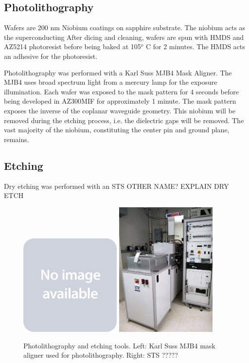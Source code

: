 \documentclass[11 pt, oneside]{book} %
\begin{document}
\subsection{Photolithography}
Wafers are 200 nm Niobium coatings on sapphire substrate. The niobium acts as the superconducting After dicing and cleaning, wafers are spun with HMDS and AZ5214 photoresist before being baked at 105$^o$ C for 2 minutes. The HMDS acts an adhesive for the photoresist. 

Photolithography was performed with a Karl Suss MJB4 Mask Aligner. The MJB4 uses broad spectrum light from a mercury lamp for the exposure illumination. Each wafer was exposed to the mask pattern for 4 seconds before being developed in AZ300MIF for approximately 1 minute. The mask pattern exposes the inverse of the coplanar waveguide geometry. This niobium will be removed during the etching process, i.e. the dielectric gaps will be removed. The vast majority of the niobium, constituting the center pin and ground plane, remains. 

\subsection{Etching}
Dry etching was performed with an STS OTHER NAME? EXPLAIN DRY ETCH

\begin{figure}[h] 
   \centering
   \includegraphics[width=2in]{placeholder.jpg} \includegraphics[width=2in]{STS.jpg} 
   \caption[Photolithography and etching tools]{Photolithography and etching tools. Left: Karl Suss MJB4 mask aligner used for photolithography. Right: STS ?????}
   \label{fig:Wirebonding}
\end{figure}
\end{document}
